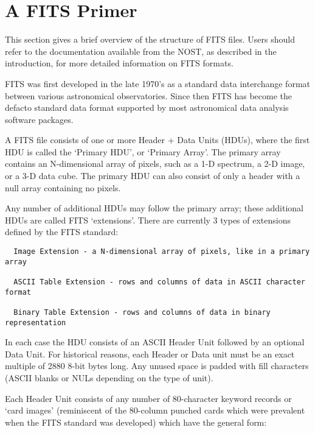 \chapter{  A FITS Primer }

This section gives a brief overview of the structure of FITS files.
Users should refer to the documentation available from the NOST, as
described in the introduction, for more detailed information on FITS
formats.

FITS was first developed in the late 1970's as a standard data
interchange format between various astronomical observatories.  Since
then FITS has become the defacto standard data format supported by most
astronomical data analysis software packages.

A FITS file consists of one or more Header + Data Units (HDUs), where
the first HDU is called the `Primary HDU', or `Primary Array'.  The
primary array contains an N-dimensional array of pixels, such as a 1-D
spectrum, a 2-D image, or a 3-D data cube.  The primary HDU can also
consist of only a header with a null array containing no pixels.

Any number of additional HDUs may follow the primary array; these
additional HDUs are called FITS `extensions'.  There are currently 3
types of extensions defined by the FITS standard:

\begin{verbatim}
  Image Extension - a N-dimensional array of pixels, like in a primary array

  ASCII Table Extension - rows and columns of data in ASCII character format

  Binary Table Extension - rows and columns of data in binary representation
\end{verbatim}
In each case the HDU consists of an ASCII Header Unit followed by an optional
Data Unit.  For historical reasons, each Header or Data unit must be an
exact multiple of 2880 8-bit bytes long.  Any unused space is padded
with fill characters (ASCII blanks or NULs depending on the type of unit).

Each Header Unit consists of any number of 80-character keyword records
or `card images' (reminiscent of the 80-column punched cards which
were prevalent when the FITS standard was developed) which have the
general form:

